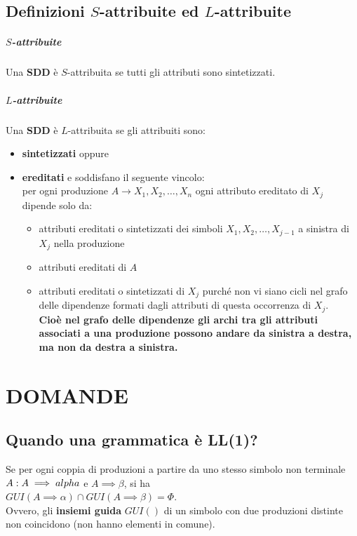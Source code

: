 \documentclass[12pt]{article}
\begin{document}
\subsection{Definizioni $S$-attribuite ed $L$-attribuite}
\subparagraph*{$S$-attribuite}
Una \textbf{SDD} è $S$-attribuita se tutti gli attributi sono sintetizzati.
\subparagraph*{$L$-attribuite}
Una \textbf{SDD} è $L$-attribuita se gli attribuiti sono:
\begin{itemize}
    \item \textbf{sintetizzati} oppure
    \item \textbf{ereditati} e soddisfano il seguente vincolo:\\
    per ogni produzione $A \rightarrow X_1, X_2, \dots, X_n$ ogni attributo ereditato di $X_j$ dipende solo da:
    \begin{itemize}
        \item attributi ereditati o sintetizzati dei simboli $X_1,X_2, \dots, X_{j-1}$ a sinistra di $X_j$ nella produzione
        \item attributi ereditati di $A$
        \item attributi ereditati o sintetizzati di $X_j$ purché non vi siano cicli nel grafo delle dipendenze formati dagli attributi di questa occorrenza di $X_j$.
        \\ \textbf{Cioè nel grafo delle dipendenze gli archi tra gli attributi associati a una produzione possono andare da sinistra a destra, ma non da destra a sinistra.}
    \end{itemize}
\end{itemize}

\newpage


\section{DOMANDE}
\subsection{Quando una grammatica è LL(1)?}
Se per ogni coppia di produzioni a partire da uno stesso simbolo non terminale $A:\\
A\implies alpha$ e $A \implies \beta$, si ha\\
$GUI(A \implies \alpha) \cap GUI(A \implies \beta) = \Phi$.\\
Ovvero, gli \textbf{insiemi guida} $GUI()$ di un simbolo con due produzioni distinte non coincidono (non hanno elementi in comune).
\end{document}
